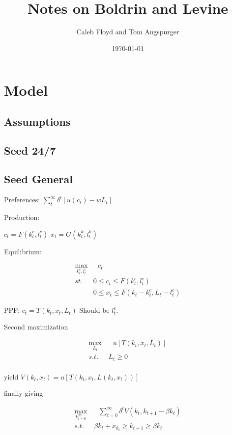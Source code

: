 \documentclass[11pt]{article}
\title{Notes on Boldrin and Levine}
\author{Caleb Floyd and Tom Augspurger}
\date{\today}
\begin{document}
\maketitle

\section{Model}
\label{sec:model}

\subsection{Assumptions}
\label{sub:assumptions}

\subsection{Seed 24/7}
\label{sub:seed_24_7}

\subsection{Seed General}
\label{sub:seed_general}

  Preferences: $\sum_t^\infty \delta^t [u(c_t) - wL_t]$

  Production:

  $c_t = F(k_t^c, l_t^c)$
  $x_t = G(k_t^k, l_t^k)$

  Equilibrium:

  \begin{align}
    \max_{k^c_t, l^c_t} & \ \ \ c_t\\
    st. & 0 \leq c_t \leq F(k_t^c, l_t^c)\\
        & 0 \leq x_t \leq F(k_t - k_t^c, L_t - l_t^c)
  \end{align}

  PPF: $c_t = T(k_t, x_t, L_t)$ Should be $l^c_t$.

  Second maximization

  \begin{align}
    \max_{L_t} & \ \ \  u[T(k_t, x_t, L_t)] \\
    s.t. \ \ \ & L_t \geq 0\\
  \end{align}

  yield $V(k_t, x_t) = u[T(k_t, x_t, L(k_t, x_t))]$

  finally giving

  \begin{align}
    \max_{k_{t=0}^\infty} & \ \ \ \sum_{t=0}^{\infty} \delta^t V(k_t, k_{t+1} - \beta k_t)\\
    s.t. \ \ \ & \beta k_t + \bar{x}_{k_t} \geq k_{t+1} \geq \beta k_t
  \end{align}
\end{document}
